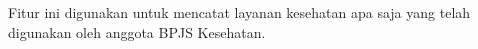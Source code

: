 Fitur ini digunakan untuk mencatat layanan kesehatan apa saja yang telah digunakan oleh anggota BPJS Kesehatan.